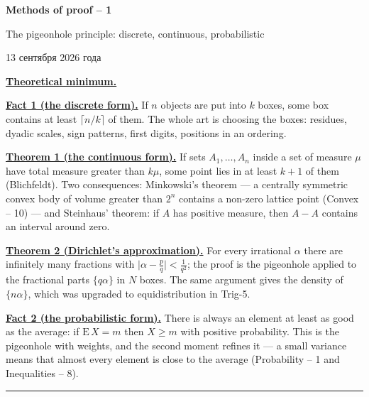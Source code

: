 \documentclass[11pt,a4paper]{article}
\renewcommand{\ge}{\geqslant}
\newcommand{\head}[1]{\par\bigskip\noindent\textbf{\underline{#1}}\quad}
\begin{document}
\begin{center}
{\huge\bfseries Methods of proof -- 1\par}\vspace{1.2em}
{\Large The pigeonhole principle: discrete, continuous, probabilistic\par}\vspace{0.8em}
{\foreignlanguage{russian}{13 сентября 2026 года}\par}
\end{center}\vspace{0.5em}

\noindent\textbf{\underline{Theoretical minimum.}}\par

\head{Fact 1 (the discrete form).} If $n$ objects are put into $k$ boxes, some box contains at
least $\lceil n/k\rceil$ of them. The whole art is choosing the boxes: residues, dyadic scales,
sign patterns, first digits, positions in an ordering.

\head{Theorem 1 (the continuous form).} If sets $A_1,\dots,A_n$ inside a set of measure $\mu$
have total measure greater than $k\mu$, some point lies in at least $k+1$ of them (Blichfeldt).
Two consequences: Minkowski's theorem --- a centrally symmetric convex body of volume greater
than $2^n$ contains a non-zero lattice point (Convex -- 10) --- and Steinhaus' theorem: if $A$
has positive measure, then $A-A$ contains an interval around zero.

\head{Theorem 2 (Dirichlet's approximation).} For every irrational $\alpha$ there are
infinitely many fractions with $\bigl|\alpha-\frac pq\bigr|<\frac1{q^2}$; the proof is the
pigeonhole applied to the fractional parts $\{q\alpha\}$ in $N$ boxes. The same argument gives
the density of $\{n\alpha\}$, which was upgraded to equidistribution in Trig-5.

\head{Fact 2 (the probabilistic form).} There is always an element at least as good as the
average: if $\mathrm E\,X=m$ then $X\ge m$ with positive probability. This is the pigeonhole
with weights, and the second moment refines it --- a small variance means that almost every
element is close to the average (Probability -- 1 and Inequalities -- 8).

\bigskip\noindent\rule{\linewidth}{0.4pt}
\end{document}
